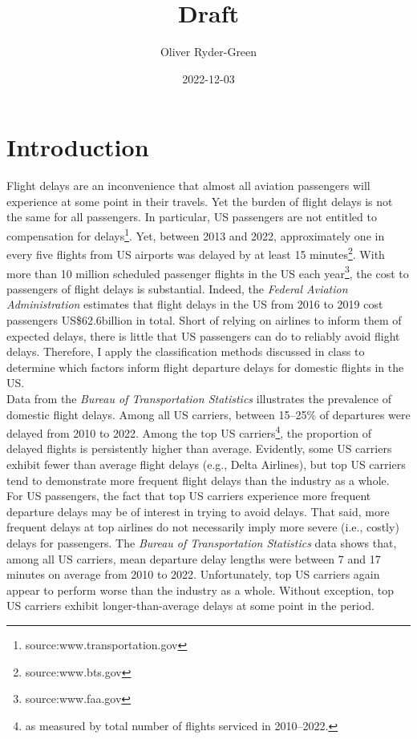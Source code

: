 \documentclass[
]{article}
\title{Draft}
\author{Oliver Ryder-Green}
\date{2022-12-03}
\begin{document}
\maketitle

\clearpage

\section{Introduction}

Flight delays are an inconvenience that almost all aviation passengers
will experience at some point in their travels. Yet the burden of flight
delays is not the same for all passengers. In particular, US passengers
are not entitled to compensation for
delays\footnote{source:www.transportation.gov}. Yet, between 2013 and
2022, approximately one in every five flights from US airports was
delayed by at least 15 minutes\footnote{source:www.bts.gov}. With more
than 10 million scheduled passenger flights in the US each
year\footnote{source:www.faa.gov}, the cost to passengers of flight
delays is substantial. Indeed, the
\textit{Federal Aviation Administration} estimates that flight delays in
the US from 2016 to 2019 cost passengers US\$62.6billion in total. Short
of relying on airlines to inform them of expected delays, there is
little that US passengers can do to reliably avoid flight delays.
Therefore, I apply the classification methods discussed in class to
determine which factors inform flight departure delays for domestic
flights in the US.\\

Data from the \textit{Bureau of Transportation Statistics} illustrates
the prevalence of domestic flight delays. Among all US carriers, between
15--25\% of departures were delayed from 2010 to 2022. Among the top US
carriers\footnote{as measured by total number of flights serviced in 2010--2022.},
the proportion of delayed flights is persistently higher than average.
Evidently, some US carriers exhibit fewer than average flight delays
(e.g., Delta Airlines), but top US carriers tend to demonstrate more
frequent flight delays than the industry as a whole.\\

For US passengers, the fact that top US carriers experience more
frequent departure delays may be of interest in trying to avoid delays.
That said, more frequent delays at top airlines do not necessarily imply
more severe (i.e., costly) delays for passengers. The
\textit{Bureau of Transportation Statistics} data shows that, among all
US carriers, mean departure delay lengths were between 7 and 17 minutes
on average from 2010 to 2022. Unfortunately, top US carriers again
appear to perform worse than the industry as a whole. Without exception,
top US carriers exhibit longer-than-average delays at some point in the
period.\\
\end{document}
